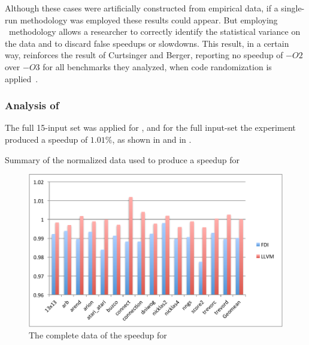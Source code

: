 Although these cases were artificially constructed from empirical data, if a single-run methodology was employed these results could appear. But employing \CP\ methodology allows a researcher to correctly identify the statistical variance on the data and to discard false speedups or slowdowns. This result, in a certain way, reinforces the result of Curtsinger and Berger, reporting no speedup of $-O2$ over $-O3$ for all benchmarks they analyzed, when code randomization is applied~\cite{Curtsinger2013}.


\subsubsection{Analysis of \gobmk}

The full 15-input set was applied for \gobmk, and for the full input-set the experiment produced a speedup of $1.01 \%$, as shown in  and in .

\begin{table}
  \centering
  \begin{tiny}
  
  \end{tiny}
  \caption{Summary of the normalized data used to produce a speedup for \gcc}
  \label{tab:fullspeedupgbk}
\end{table}

\begin{figure}
  \centering
  \includegraphics[width=1.00\linewidth]{Figures/speedupgbkall}
  \caption{The complete data of the speedup for \gobmk}
  \label{fig:gobmkall}
\end{figure}


